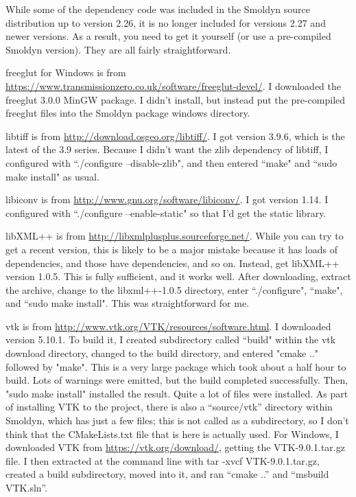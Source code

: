 \documentclass {book}
\begin{document}
While some of the dependency code was included in the Smoldyn source distribution up to version 2.26, it is no longer included for versions 2.27 and newer versions. As a result, you need to get it yourself (or use a pre-compiled Smoldyn version). They are all fairly straightforward.

freeglut for Windows is from \url{https://www.transmissionzero.co.uk/software/freeglut-devel/}. I downloaded the freeglut 3.0.0 MinGW package. I didn't install, but instead put the pre-compiled freeglut files into the Smoldyn package windows directory.

libtiff is from \url{http://download.osgeo.org/libtiff/}. I got version 3.9.6, which is the latest of the 3.9 series. Because I didn't want the zlib dependency of libtiff, I configured with ``./configure --disable-zlib", and then entered ``make" and ``sudo make install" as usual.

libiconv is from \url{http://www.gnu.org/software/libiconv/}. I got version 1.14. I configured with ``./configure --enable-static" so that I'd get the static library.

libXML++ is from \url{http://libxmlplusplus.sourceforge.net/}. While you can try to get a recent version, this is likely to be a major mistake because it has loads of dependencies, and those have dependencies, and so on. Instead, get libXML++ version 1.0.5. This is fully sufficient, and it works well. After downloading, extract the archive, change to the libxml++-1.0.5 directory, enter ``./configure", ``make", and ``sudo make install". This was straightforward for me.

vtk is from \url{http://www.vtk.org/VTK/resources/software.html}. I downloaded version 5.10.1. To build it, I created subdirectory called ``build" within the vtk download directory, changed to the build directory, and entered "cmake .." followed by "make". This is a very large package which took about a half hour to build. Lots of warnings were emitted, but the build completed successfully. Then, "sudo make install" installed the result. Quite a lot of files were installed. As part of installing VTK to the project, there is also a ``source/vtk'' directory within Smoldyn, which has just a few files; this is not called as a subdirectory, so I don't think that the CMakeLists.txt file that is here is actually used. For Windows, I downloaded VTK from \url{https://vtk.org/download/}, getting the VTK-9.0.1.tar.gz file. I then extracted at the command line with tar -xvcf VTK-9.0.1.tar.gz, created a build subdirectory, moved into it, and ran ``cmake ..'' and ``msbuild VTK.sln''.
\end{document}
